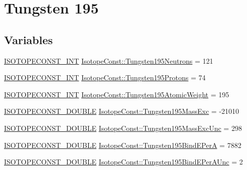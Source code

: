 \hypertarget{group___isotope_const-_tungsten-_w195}{}\section{Tungsten 195}
\label{group___isotope_const-_tungsten-_w195}
\subsection*{Variables}
\begin{DoxyCompactItemize}
\item 
\mbox{\hyperlink{group___isotope_const-_macros_ga5f18360b3e99483a35c32d789e62621c}{I\+S\+O\+T\+O\+P\+E\+C\+O\+N\+S\+T\+\_\+\+I\+NT}} \mbox{\hyperlink{group___isotope_const-_tungsten-_w195_gae04aad79536fd1e4372bcf2944575fab}{Isotope\+Const\+::\+Tungsten195\+Neutrons}} = 121
\item 
\mbox{\hyperlink{group___isotope_const-_macros_ga5f18360b3e99483a35c32d789e62621c}{I\+S\+O\+T\+O\+P\+E\+C\+O\+N\+S\+T\+\_\+\+I\+NT}} \mbox{\hyperlink{group___isotope_const-_tungsten-_w195_ga0b941fddcb99dbbfbc261eb11f7c7325}{Isotope\+Const\+::\+Tungsten195\+Protons}} = 74
\item 
\mbox{\hyperlink{group___isotope_const-_macros_ga5f18360b3e99483a35c32d789e62621c}{I\+S\+O\+T\+O\+P\+E\+C\+O\+N\+S\+T\+\_\+\+I\+NT}} \mbox{\hyperlink{group___isotope_const-_tungsten-_w195_gaf82c847fb5a06813fc0986a87e73c285}{Isotope\+Const\+::\+Tungsten195\+Atomic\+Weight}} = 195
\item 
\mbox{\hyperlink{group___isotope_const-_macros_ga8f45a7272ce02c0b4c65c44636ed719a}{I\+S\+O\+T\+O\+P\+E\+C\+O\+N\+S\+T\+\_\+\+D\+O\+U\+B\+LE}} \mbox{\hyperlink{group___isotope_const-_tungsten-_w195_gab558913964d69d95bad2c8b0d5b9591f}{Isotope\+Const\+::\+Tungsten195\+Mass\+Exc}} = -\/21010
\item 
\mbox{\hyperlink{group___isotope_const-_macros_ga8f45a7272ce02c0b4c65c44636ed719a}{I\+S\+O\+T\+O\+P\+E\+C\+O\+N\+S\+T\+\_\+\+D\+O\+U\+B\+LE}} \mbox{\hyperlink{group___isotope_const-_tungsten-_w195_ga375dd1425c5e320c294d7716d6d46af9}{Isotope\+Const\+::\+Tungsten195\+Mass\+Exc\+Unc}} = 298
\item 
\mbox{\hyperlink{group___isotope_const-_macros_ga8f45a7272ce02c0b4c65c44636ed719a}{I\+S\+O\+T\+O\+P\+E\+C\+O\+N\+S\+T\+\_\+\+D\+O\+U\+B\+LE}} \mbox{\hyperlink{group___isotope_const-_tungsten-_w195_gaefdcdda37501037a01bd055dd4f310e5}{Isotope\+Const\+::\+Tungsten195\+Bind\+E\+PerA}} = 7882
\item 
\mbox{\hyperlink{group___isotope_const-_macros_ga8f45a7272ce02c0b4c65c44636ed719a}{I\+S\+O\+T\+O\+P\+E\+C\+O\+N\+S\+T\+\_\+\+D\+O\+U\+B\+LE}} \mbox{\hyperlink{group___isotope_const-_tungsten-_w195_ga484058073f321f9a37fbb8689ec7f1d0}{Isotope\+Const\+::\+Tungsten195\+Bind\+E\+Per\+A\+Unc}} = 2

\end{DoxyCompactItemize}
